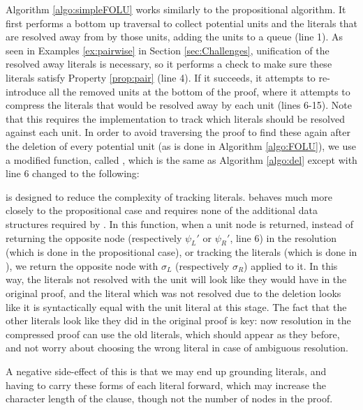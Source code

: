 Algorithm \ref{algo:simpleFOLU} works similarly to the propositional algorithm.  It first performs a bottom up traversal to collect potential units and the literals that are resolved away from by those units, adding the units to a queue (line 1). As seen in Examples \ref{ex:pairwise} in Section \ref{sec:Challenges}, unification of the resolved away literals is necessary, so it performs a check to make sure these literals satisfy Property \ref{prop:pair} (line 4). If it succeeds, it attempts to re-introduce all the removed units at the bottom of the proof, where it attempts to compress the literals that would be resolved away by each unit (lines 6-15). Note that this requires the implementation to track which literals should be resolved against each unit. In order to avoid traversing the proof to find these again after the deletion of every potential unit (as is done in Algorithm \ref{algo:FOLU}), we use a modified  function, called , which is the same as Algorithm \ref{algo:del} except with line 6 changed to the following:


 is designed to reduce the complexity of tracking literals.  behaves much more closely to the propositional case and requires none of the additional data structures required by . In this function, when a unit node is returned, instead of returning the opposite node (respectively $\psi_L'$ or $\psi_R'$, line 6) in the resolution (which is done in the propositional case), or tracking the literals (which is done in ), we return the opposite node with $\sigma_L$ (respectively $\sigma_R$) applied to it. In this way, the literals not resolved with the unit will look like they would have in the original proof, and the literal which was not resolved due to the deletion looks like it is syntactically equal with the unit literal at this stage. The fact that the other literals look like they did in the original proof is key: now resolution in the compressed proof can use the old literals, which should appear as they before, and not worry about choosing the wrong literal in case of ambiguous resolution.

A negative side-effect of this is that we may end up grounding literals, and having to carry these forms of each literal forward, which may increase the character length of the clause, though not the number of nodes in the proof.

